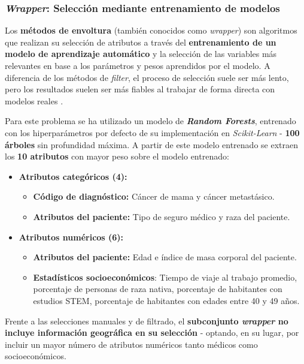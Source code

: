\subsubsection{\textit{Wrapper}: Selección mediante entrenamiento de modelos}

Los \textbf{métodos de envoltura} (también conocidos como \textit{wrapper}) son algoritmos que realizan su selección de atributos a través del \textbf{entrenamiento de un modelo de aprendizaje automático} y la selección de las variables más relevantes en base a los parámetros y pesos aprendidos por el modelo. A diferencia de los métodos de \textit{filter}, el proceso de selección suele ser más lento, pero los resultados suelen ser más fiables al trabajar de forma directa con modelos reales \cite{featureselection}.

Para este problema se ha utilizado un modelo de \textbf{\textit{Random Forests}}, entrenado con los hiperparámetros por defecto de su implementación en \textit{Scikit-Learn} - \textbf{100 árboles} sin profundidad máxima. A partir de este modelo entrenado se extraen los \textbf{10 atributos} con mayor peso sobre el modelo entrenado: 

\begin{itemize}[parsep=1pt, itemsep=1pt, topsep=4pt]
	\item \textbf{Atributos categóricos (4):} 
	\begin{itemize}[parsep=1pt, itemsep=1pt, topsep=4pt]
		\item \textbf{Código de diagnóstico:} Cáncer de mama y cáncer metastásico.
		\item \textbf{Atributos del paciente:} Tipo de seguro médico y raza del paciente.
	\end{itemize}
	\item \textbf{Atributos numéricos (6):}
	\begin{itemize}[parsep=1pt, itemsep=1pt, topsep=4pt]
		\item \textbf{Atributos del paciente:} Edad e índice de masa corporal del paciente.
		\item \textbf{Estadísticos socioeconómicos}: Tiempo de viaje al trabajo promedio, porcentaje de personas de raza nativa, porcentaje de habitantes con estudios STEM, porcentaje de habitantes con edades entre 40 y 49 años.
	\end{itemize}
\end{itemize}

Frente a las selecciones manuales y de filtrado, el \textbf{subconjunto \textit{wrapper} no incluye información geográfica en su selección} - optando, en su lugar, por incluir un mayor número de atributos numéricos tanto médicos como socioeconómicos.

